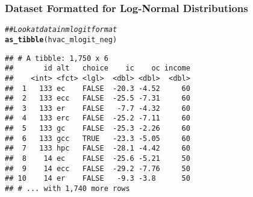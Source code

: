 \documentclass{beamer}\usepackage[]{graphicx}\usepackage[]{color}
\makeatletter
\newcommand{\hlnum}[1]{\textcolor[rgb]{0.686,0.059,0.569}{#1}}%
\newcommand{\hlstr}[1]{\textcolor[rgb]{0.192,0.494,0.8}{#1}}%
\newcommand{\hlcom}[1]{\textcolor[rgb]{0.678,0.584,0.686}{\textit{#1}}}%
\newcommand{\hlopt}[1]{\textcolor[rgb]{0,0,0}{#1}}%
\newcommand{\hlstd}[1]{\textcolor[rgb]{0.345,0.345,0.345}{#1}}%
\newcommand{\hlkwb}[1]{\textcolor[rgb]{0.69,0.353,0.396}{#1}}%
\newcommand{\hlkwc}[1]{\textcolor[rgb]{0.333,0.667,0.333}{#1}}%
\newcommand{\hlkwd}[1]{\textcolor[rgb]{0.737,0.353,0.396}{\textbf{#1}}}%
\newenvironment{kframe}{%
 \def\at@end@of@kframe{}%
 \ifinner\ifhmode%
  \def\at@end@of@kframe{\end{minipage}}%
  \begin{minipage}{\columnwidth}%
 \fi\fi%
 \def\FrameCommand##1{\hskip\@totalleftmargin \hskip-\fboxsep
 \colorbox{shadecolor}{##1}\hskip-\fboxsep
     \hskip-\linewidth \hskip-\@totalleftmargin \hskip\columnwidth}%
 \MakeFramed {\advance\hsize-\width
   \@totalleftmargin\z@ \linewidth\hsize
   \@setminipage}}%
 {\par\unskip\endMakeFramed%
 \at@end@of@kframe}
\newenvironment{knitrout}{}{} %
\makeatother
\begin{document}
\begin{frame}[fragile]\frametitle{Dataset Formatted for Log-Normal Distributions}
\begin{knitrout}\footnotesize
{}\color{fgcolor}\begin{kframe}
\begin{alltt}
\hlcom{## Look at data in mlogit format}
\hlkwd{as_tibble}\hlstd{(hvac_mlogit_neg)}
\end{alltt}
\begin{verbatim}
## # A tibble: 1,750 x 6
##       id alt   choice    ic    oc income
##    <int> <fct> <lgl>  <dbl> <dbl>  <dbl>
##  1   133 ec    FALSE  -20.3 -4.52     60
##  2   133 ecc   FALSE  -25.5 -7.31     60
##  3   133 er    FALSE   -7.7 -4.32     60
##  4   133 erc   FALSE  -25.2 -7.11     60
##  5   133 gc    FALSE  -25.3 -2.26     60
##  6   133 gcc   TRUE   -23.3 -5.05     60
##  7   133 hpc   FALSE  -28.1 -4.42     60
##  8    14 ec    FALSE  -25.6 -5.21     50
##  9    14 ecc   FALSE  -29.2 -7.76     50
## 10    14 er    FALSE   -9.3 -3.8      50
## # ... with 1,740 more rows
\end{verbatim}
\end{kframe}
\end{knitrout}
\end{frame}

\end{document}
